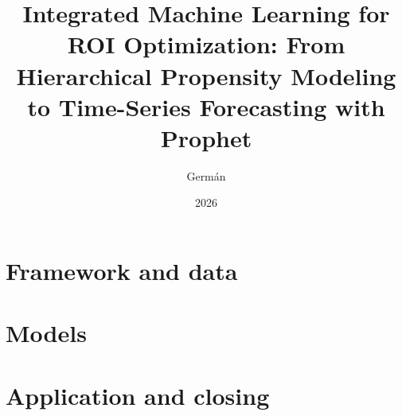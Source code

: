 \documentclass[12pt, a4paper, twoside, openany]{book}
\title{Integrated Machine Learning for ROI Optimization: From Hierarchical Propensity Modeling to Time-Series Forecasting with Prophet}
\author{Germán}
\date{2026}
\begin{document}
\frontmatter



\tableofcontents
\listoffigures
\listoftables

\mainmatter
\part{Framework and data}





\part{Models}





\part{Application and closing}



\appendix


\backmatter
\printbibliography[heading=bibintoc, title={Bibliography}]
\end{document}
